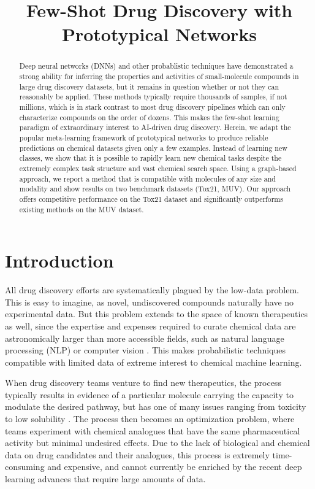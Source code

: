 \documentclass{article}
\title{Few-Shot Drug Discovery with Prototypical Networks}
\begin{document}
\nolinenumbers

\maketitle


\begin{abstract}
Deep neural networks (DNNs) and other probablistic techniques have demonstrated a strong ability for inferring the properties and activities of small-molecule compounds in large drug discovery datasets, but it remains in question whether or not they can reasonably be applied.  These methods typically require thousands of samples, if not millions, which is in stark contrast to most drug discovery pipelines which can only characterize compounds on the order of dozens. This makes the few-shot learning paradigm of extraordinary interest to AI-driven drug discovery. Herein, we adapt the popular meta-learning framework of prototypical networks to produce reliable predictions on chemical datasets given only a few examples. Instead of learning new classes, we show that it is possible to rapidly learn new chemical tasks despite the extremely complex task structure and vast chemical search space. Using a graph-based approach, we report a method that is compatible with molecules of any size and modality and show results on two benchmark datasets (Tox21, MUV).  Our approach offers competitive performance on the Tox21 dataset and significantly outperforms existing methods on the MUV dataset.
\end{abstract}


\section{Introduction}


All drug discovery efforts are systematically plagued by the low-data problem. This is easy to imagine, as novel, undiscovered compounds naturally have no experimental data. But this problem extends to the space of known therapeutics as well, since the expertise and expenses required to curate chemical data are astronomically larger than more accessible fields, such as natural language processing (NLP) or computer vision \cite{lusher2014data}. This makes probabilistic techniques compatible with limited data of extreme interest to chemical machine learning.


When drug discovery teams venture to find new therapeutics, the process typically results in evidence of a particular molecule carrying the capacity to modulate the desired pathway, but has one of many issues ranging from toxicity to low solubility \cite{waring2015analysis}.  The process then becomes an optimization problem, where teams experiment with chemical analogues that have the same pharmaceutical activity but minimal undesired effects.  Due to the lack of biological and chemical data on drug candidates and their analogues, this process is extremely time-consuming and expensive, and cannot currently be enriched by the recent deep learning advances that require large amounts of data.
\end{document}
